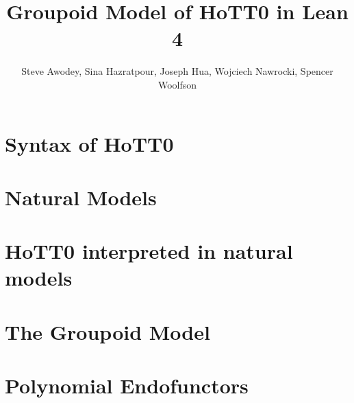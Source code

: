 
\title{Groupoid Model of HoTT0 in Lean 4}
\author{Steve Awodey, Sina Hazratpour, Joseph Hua,
  Wojciech Nawrocki, Spencer Woolfson}


\maketitle

\chapter{Syntax of HoTT0}

\chapter{Natural Models}

\chapter{HoTT0 interpreted in natural models}

\chapter{The Groupoid Model}

\chapter{Polynomial Endofunctors}


{}



